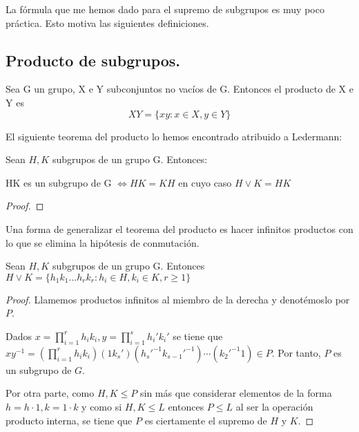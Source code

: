 La fórmula que me hemos dado para el supremo de subgrupos es muy poco práctica. Esto motiva las siguientes definiciones.

\subsection{Producto de subgrupos.}

\begin{ndef}
Sea G un grupo, X e Y subconjuntos no vacíos de G. Entonces el producto de X e Y es
$$XY = \{xy:x \in X,y \in Y\}$$
\end{ndef}

El siguiente teorema del producto lo hemos encontrado atribuido a Ledermann:

\begin{nprop}\label{theorem:teorema-producto}
Sean $H,K$ subgrupos de un grupo G. Entonces:

HK es un subgrupo de G $\iff HK = KH$
en cuyo caso $H \lor K = HK$
\end{nprop}
\begin{proof}

\end{proof}

Una forma de generalizar el teorema del producto es hacer infinitos productos con lo que se elimina la hipótesis de conmutación.

\begin{nprop}
Sean $H,K$ subgrupos de un grupo G. Entonces $H \lor K = \{h_1k_1...h_rk_r: h_i \in H,k_i \in K,r \ge 1\}$
\end{nprop}
\begin{proof}
Llamemos productos infinitos al miembro de la derecha y denotémoslo por $P$.

Dados $x = \prod_{i = 1}^r h_ik_i, y = \prod_{i = 1}^s h_i'k_i'$ se tiene que $xy^{-1} = (\prod_{i = 1}^r h_ik_i)(1k_s')(h_s'^{-1}k_{s-1}'^{-1})\cdots(k_2'^{-1}1) \in P$. Por tanto, $P$ es un subgrupo de $G$. 

Por otra parte, como $H,K \le P$ sin más que considerar elementos de la forma $h = h \cdot 1,k = 1 \cdot k$ y como si $H,K \le L$ entonces $P \le L$ al ser la operación producto interna, se tiene que $P$ es ciertamente el supremo de $H$ y $K$.  
\end{proof}

